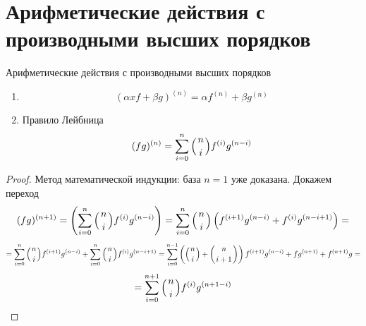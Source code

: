 \section{Арифметические действия с производными высших порядков}

\begin{theorem}{Арифметические действия с производными высших порядков}
\begin{enumerate}
\item 
$$ (\alpha x f + \beta g)^{(n)} = \alpha f^{(n)} + \beta g^{(n)} $$
\item Правило Лейбница
$$ (fg)^{(n)} = \sum_{i=0}^n {\left(n \atop i\right)} f^{(i)} g^{(n-i)} $$
\end{enumerate}
\end{theorem}
\begin{proof}
Метод математической индукции: база $n=1$ уже доказана. Докажем переход
$$ (fg)^{(n+1)} = \left( \sum_{i=0}^{n} {\left(n \atop i\right)} f^{(i)} g^{(n-i)} \right) = \sum_{i=0}^{n} {\left(n \atop i\right)} \left(f^{(i+1)} g^{(n-i)} + f^{(i)} g^{(n-i+1)}\right) = $$ 
$$ = \sum_{i=0}^n {\left(n \atop i\right)} f^{(i+1)} g^{(n-i)} + \sum_{i=0}^n {\left(n \atop i\right)} f^{(i)} g^{(n-i+1)} = \sum_{i=0}^{n-1} \left({\left(n \atop i\right)} + {\left(n \atop i + 1\right)}\right) f^{(i+1)} g^{(n-i)} + fg^{(n+1)} + f^{(n+1)}g = $$
$$ = \sum_{i=0}^{n+1} {\left(n \atop i\right)} f^{(i)}g^{(n+1-i)} $$
\end{proof}